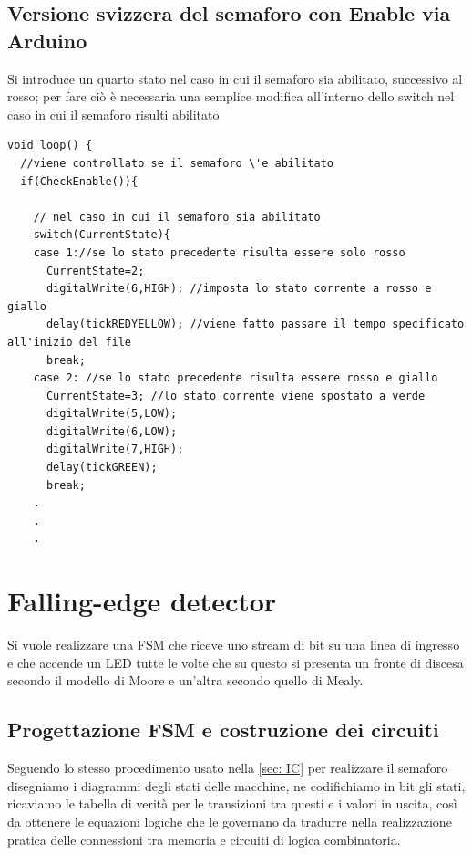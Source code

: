 \documentclass[10pt, a4paper, italian]{article}
\begin{document}
\subsection{Versione svizzera del semaforo con Enable via Arduino}
Si introduce un quarto stato nel caso in cui il semaforo sia abilitato, successivo al rosso; per fare ciò è necessaria una semplice modifica all'interno dello switch nel caso in cui il semaforo risulti abilitato
\begin{lstlisting}[label={list: sviz}, style=Arduino, caption=semf-svizzero.ino]
void loop() {
  //viene controllato se il semaforo \'e abilitato
  if(CheckEnable()){ 
    
    // nel caso in cui il semaforo sia abilitato
    switch(CurrentState){  
    case 1://se lo stato precedente risulta essere solo rosso
      CurrentState=2;
      digitalWrite(6,HIGH); //imposta lo stato corrente a rosso e giallo
      delay(tickREDYELLOW); //viene fatto passare il tempo specificato all'inizio del file
      break;
    case 2: //se lo stato precedente risulta essere rosso e giallo
      CurrentState=3; //lo stato corrente viene spostato a verde
      digitalWrite(5,LOW);
      digitalWrite(6,LOW);
      digitalWrite(7,HIGH);  
      delay(tickGREEN); 
      break; 
    .
    .
    .
\end{lstlisting}

\section{Falling-edge detector}
Si vuole realizzare una FSM che riceve uno stream di bit su una linea di
ingresso e che accende un LED tutte le volte che su questo si presenta un
fronte di discesa secondo il modello di Moore e un'altra secondo quello di
Mealy.

\subsection{Progettazione FSM e costruzione dei circuiti}
Seguendo lo stesso procedimento usato nella \cref{sec: IC} per realizzare il
semaforo disegniamo i diagrammi degli stati delle macchine, ne codifichiamo in
bit gli stati, ricaviamo le tabella di verità per le transizioni tra questi e
i valori in uscita, così da ottenere le equazioni logiche che le governano da
tradurre nella realizzazione pratica delle connessioni tra memoria e circuiti
di logica combinatoria.
\end{document}

